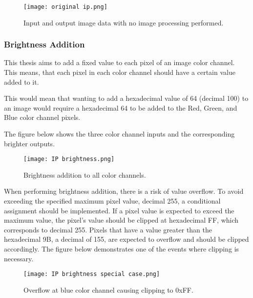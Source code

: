 \begin{figure}[H]
	\centering
	\texttt{[image: original ip.png]}
	\caption{Input and output image data with no image processing performed.}
	\label{fig:iporiginal}  
\end{figure}

\subsubsection{Brightness Addition}
\par This thesis aims to add a fixed value to each pixel of an image color channel. This means, that each pixel in each color channel should have a certain value added to it. \newline
\par This would mean that wanting to add a hexadecimal value of 64 (decimal 100) to an image would require a hexadecimal 64 to be added to the Red, Green, and Blue color channel pixels. \newline
\par The figure below shows the three color channel inputs and the corresponding brighter outputs. \newline

\begin{figure}[H]
	\centering
	\texttt{[image: IP brightness.png]}
	\caption{Brightness addition to all color channels.}
	\label{fig:ipaddbrightness}  
\end{figure}

\par When performing brightness addition, there is a risk of value overflow. To avoid exceeding the specified maximum pixel value, decimal 255, a conditional assignment should be implemented. If a pixel value is expected to exceed the maximum value, the pixel's value should be clipped at hexadecimal FF, which corresponds to decimal 255. Pixels that have a value greater than the hexadecimal 9B, a decimal of 155, are expected to overflow and should be clipped accordingly. The figure below demonstrates one of the events where clipping is necessary. \newline

\begin{figure}[H]
	\centering
	\texttt{[image: IP brightness special case.png]}
	\caption{Overflow at blue color channel causing clipping to 0xFF.}
	\label{fig:ipaddbrightnesscase}  
\end{figure}

